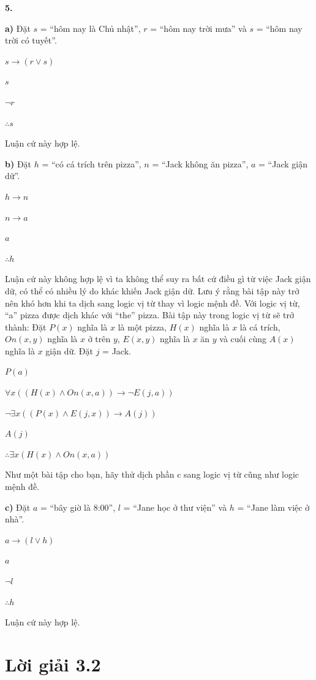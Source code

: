 \documentclass[12pt,a4paper]{article}
\theoremstyle{definition}
\begin{document}
\bigskip
\textbf{5.}

\textbf{a)} Đặt $s$ = ``hôm nay là Chủ nhật'', $r$ = ``hôm nay trời mưa'' và $s$ = ``hôm nay trời có tuyết''.

$s \to (r \lor s)$

$s$

$\neg r$

$\therefore s$

Luận cứ này hợp lệ.

\medskip
\textbf{b)} Đặt $h$ = ``có cá trích trên pizza'', $n$ = ``Jack không ăn pizza'', $a$ = ``Jack giận dữ''.

$h \to n$

$n \to a$

$a$

$\therefore h$

Luận cứ này không hợp lệ vì ta không thể suy ra bất cứ điều gì từ việc Jack giận dữ, có thể có nhiều lý do khác khiến Jack giận dữ.
Lưu ý rằng bài tập này trở nên khó hơn khi ta dịch sang logic vị từ thay vì logic mệnh đề. Với logic vị từ, ``a'' pizza được dịch khác với ``the'' pizza.
Bài tập này trong logic vị từ sẽ trở thành:
Đặt $P(x)$ nghĩa là $x$ là một pizza, $H(x)$ nghĩa là $x$ là cá trích, $\textit{On}(x, y)$ nghĩa là $x$ ở trên $y$, $E(x, y)$ nghĩa là $x$ ăn $y$ và cuối cùng $A(x)$ nghĩa là $x$ giận dữ. Đặt $j$ = Jack.

$P(a)$

$\forall x((H(x) \land \textit{On}(x, a)) \to \neg E(j, a))$

$\neg\exists x((P(x) \land E(j, x)) \to A(j))$

$A(j)$

$\therefore \exists x(H(x) \land \textit{On}(x, a))$

Như một bài tập cho bạn, hãy thử dịch phần c sang logic vị từ cũng như logic mệnh đề.

\medskip
\textbf{c)} Đặt $a$ = ``bây giờ là 8:00'', $l$ = ``Jane học ở thư viện'' và $h$ = ``Jane làm việc ở nhà''.

$a \to (l \lor h)$

$a$

$\neg l$

$\therefore h$

Luận cứ này hợp lệ.

\section*{Lời giải 3.2}
\end{document}
